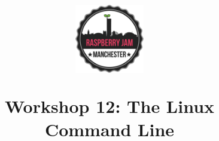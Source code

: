 \documentclass[a4paper, twocolumn, twoside, 11pt]{article}
\begin{document}
	\author{}
	\title{
		\begin{center}
			\includegraphics[width=30mm]{common/logo-512}
		\end{center}
		\vspace{12pt}
		Workshop 12: The Linux Command Line}
	\date{}
	\maketitle
	
	\setcounter{tocdepth}{1}
	\tableofcontents
	
	
	\newpage
	
	
	
	
	
	\newpage
	
	
\end{document}
